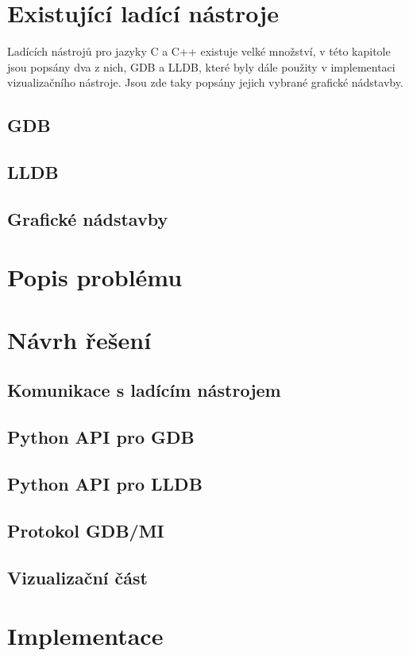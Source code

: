 \documentclass[bc,male,java,dept460]{diploma}						%
\begin{document}
\section {Existující ladící nástroje}
	Ladících nástrojů pro jazyky C a C++ existuje velké množství, v této kapitole jsou popsány dva z nich, GDB a LLDB, které byly dále použity v implementaci
	vizualizačního nástroje. Jsou zde taky popsány jejich vybrané grafické nádstavby.

	\subsection{GDB}
	\subsection{LLDB}
	\subsection{Grafické nádstavby}

\section{Popis problému}

\section{Návrh řešení}
	\subsection{Komunikace s ladícím nástrojem}
		\subsection{Python API pro GDB}
		\subsection{Python API pro LLDB}
		\subsection{Protokol GDB/MI}
		
	\subsection{Vizualizační část}
	
\section{Implementace}
\end{document}
